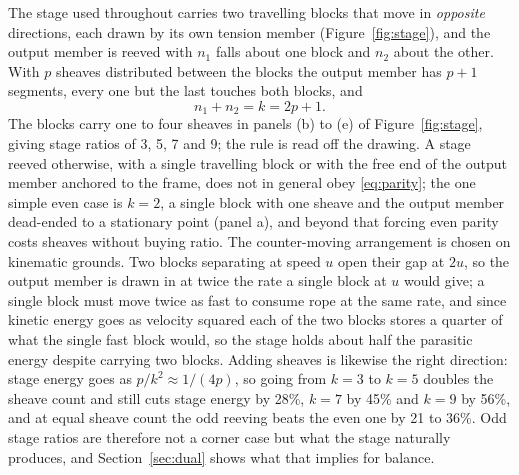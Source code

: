 \documentclass[preprint,12pt,number]{elsarticle}
\begin{document}
The stage used throughout carries two travelling blocks that move in \emph{opposite} directions, each drawn by its own tension member (Figure~\ref{fig:stage}), and the output member is reeved with $n_1$ falls about one block and $n_2$ about the other. With $p$ sheaves distributed between the blocks the output member has $p+1$ segments, every one but the last touches both blocks, and
\begin{equation}
n_1 + n_2 = k = 2p + 1 .
\label{eq:parity}
\end{equation}
The blocks carry one to four sheaves in panels (b) to (e) of Figure~\ref{fig:stage}, giving stage ratios of 3, 5, 7 and 9; the rule is read off the drawing. A stage reeved otherwise, with a single travelling block or with the free end of the output member anchored to the frame, does not in general obey \eqref{eq:parity}; the one simple even case is $k = 2$, a single block with one sheave and the output member dead-ended to a stationary point (panel a), and beyond that forcing even parity costs sheaves without buying ratio. The counter-moving arrangement is chosen on kinematic grounds. Two blocks separating at speed $u$ open their gap at $2u$, so the output member is drawn in at twice the rate a single block at $u$ would give; a single block must move twice as fast to consume rope at the same rate, and since kinetic energy goes as velocity squared each of the two blocks stores a quarter of what the single fast block would, so the stage holds about half the parasitic energy despite carrying two blocks. Adding sheaves is likewise the right direction: stage energy goes as $p/k^2 \approx 1/(4p)$, so going from $k = 3$ to $k = 5$ doubles the sheave count and still cuts stage energy by 28\%, $k = 7$ by 45\% and $k = 9$ by 56\%, and at equal sheave count the odd reeving beats the even one by 21 to 36\%. Odd stage ratios are therefore not a corner case but what the stage naturally produces, and Section~\ref{sec:dual} shows what that implies for balance.
\end{document}
